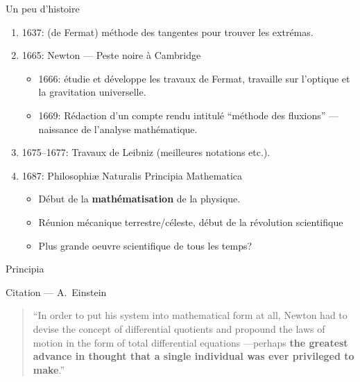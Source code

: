 \documentclass{beamer}
\begin{document}
\begin{frame}
    {Un peu d'histoire}

    \begin{enumerate}
        \item 1637: (de Fermat) méthode des tangentes pour trouver les extrémas.
            \pause{}
        \item 1665: Newton --- Peste noire à Cambridge\\
            \begin{itemize}
                \item 1666: étudie et développe les travaux de Fermat,
                    travaille sur l'optique et la gravitation universelle.
                \item 1669: Rédaction d'un compte rendu intitulé ``méthode des fluxions'' --- naissance de l'analyse mathématique.
            \end{itemize}
            \pause{}
        \item 1675--1677: Travaux de Leibniz (meilleures notations etc.).
            \pause{}
        \item 1687: Philosophiæ Naturalis Principia Mathematica\\
            \begin{itemize}
                \item Début de la \textbf{mathématisation} de la physique.
                \item Réunion mécanique terrestre/céleste, début de la révolution scientifique
                \item Plus grande oeuvre scientifique de tous les temps?
            \end{itemize}
    \end{enumerate}
\end{frame}

\begin{frame}
    {Principia}
    \begin{exampleblock}
        {Citation --- A.~Einstein}

        \begin{quote}
            ``In order to put his system into mathematical form at all,
            Newton had to devise the concept of differential quotients
            and propound the laws of motion in the form of total differential equations
            —perhaps \textbf{the greatest advance in thought that a single individual was ever privileged to make}.''
        \end{quote}
    \end{exampleblock}
\end{frame}
\end{document}
